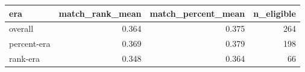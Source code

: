 \begin{tabular}{lrrr}
\toprule
era & match_rank_mean & match_percent_mean & n_eligible \\
\midrule
overall & 0.364 & 0.375 & 264 \\
percent-era & 0.369 & 0.379 & 198 \\
rank-era & 0.348 & 0.364 & 66 \\
\bottomrule
\end{tabular}
